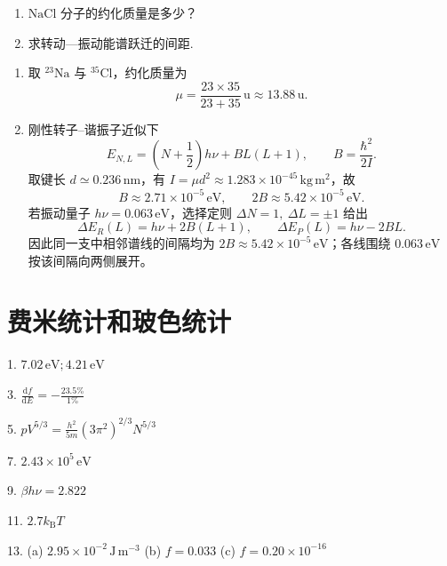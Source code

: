 \begin{exercise}\label{ex:26.11}
\begin{enumerate}
  \item[(a)] $\mathrm{NaCl}$ 分子的约化质量是多少？
  \item[(b)] 求转动—振动能谱跃迁的间距.
\end{enumerate}
\end{exercise}
\begin{solution}
\begin{enumerate}
\item[(a)] 取 ${}^{23}\mathrm{Na}$ 与 ${}^{35}\mathrm{Cl}$，约化质量为
\[
\boxed{\mu=\frac{23\times35}{23+35}\,\mathrm u\approx13.88\,\mathrm u}.
\]

\item[(b)] 刚性转子--谐振子近似下
\[
E_{N,L}=\left(N+\frac12\right)h\nu+B L(L+1),\qquad
B=\frac{\hbar^2}{2I}.
\]
取键长 $d\simeq0.236\,\mathrm{nm}$，有
$I=\mu d^2\approx1.283\times10^{-45}\,\mathrm{kg\,m^2}$，故
\[
B\approx2.71\times10^{-5}\,\mathrm{eV},\qquad
\boxed{2B\approx5.42\times10^{-5}\,\mathrm{eV}}.
\]
若振动量子 $h\nu=0.063\,\mathrm{eV}$，选择定则 $\Delta N=1,\ \Delta L=\pm1$ 给出
\[
\Delta E_R(L)=h\nu+2B(L+1),\qquad
\Delta E_P(L)=h\nu-2BL.
\]
因此同一支中相邻谱线的间隔均为 $2B\approx5.42\times10^{-5}\,\mathrm{eV}$；各线围绕 $0.063\,\mathrm{eV}$ 按该间隔向两侧展开。
\end{enumerate}
\end{solution}




\chapter{费米统计和玻色统计}

\begin{oddanswers}
1. $7.02\,\mathrm{eV}; 4.21\,\mathrm{eV}$

3. $\frac{\mathrm{d}f}{\mathrm{d}E} = -\frac{23.5\%}{1\%}$

5. $pV^{5/3} = \frac{h^2}{5m} \left(3\pi^2\right)^{2/3} N^{5/3}$

7. $2.43 \times 10^5\,\mathrm{eV}$

9. $\beta h\nu = 2.822$

11. $2.7 k_{\mathrm{B}} T$

13. (a) $2.95 \times 10^{-2}\,\mathrm{J\,m^{-3}}$
(b) $f = 0.033$
(c) $f = 0.20 \times 10^{-16}$
\end{oddanswers}

